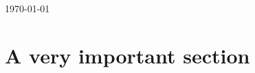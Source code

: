 \begin{titlepage}
	
	
	\vfill\vfill\vfill %
	
	{\large \today} %
	 
	
	
\end{titlepage}



\tableofcontents


\section{A very important section}




